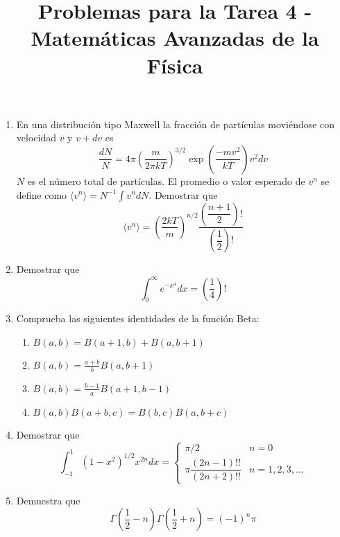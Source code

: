 
\usepackage{standalone}
\usepackage{enumerate}
\usepackage{hyperref}
\usepackage[left=1.5cm,top=1.5cm,right=1.5cm,bottom=1.5cm]{geometry}
\title{Problemas para la Tarea 4 - \\ \large{Matemáticas Avanzadas de la Física}}
\date{ }

\vspace{-4cm}
\renewcommand\labelenumii{\theenumi.{\arabic{enumii}}}
\maketitle
\fontsize{14}{14}\selectfont
\begin{enumerate}
\item En una distribución tipo Maxwell la fracción de partículas moviéndose con velocidad $v$ y $v+dv$ es
\[ \dfrac{dN}{N} = 4 \pi \left( \dfrac{m}{2 \pi k T} \right)^{3/2} \exp \left( \dfrac{-mv^{2}}{ k T} \right) v^{2} dv \]
$N$ es el número total de partículas. El promedio o valor esperado de $v^{n}$ se define como $\langle v^{n} \rangle = N^{-1} \int v^{n} dN$. Demostrar que
\[ \langle v^{n} \rangle = \left( \dfrac{2 k T}{m} \right)^{n/2} \dfrac{\left( \dfrac{n+1}{2} \right) !} { \left( \dfrac{1}{2} \right) !} \]
\item Demostrar que
\[ \int_{0}^{\infty} e^{-x^{4}} dx = \left( \dfrac{1}{4} \right) !\]
\item Comprueba las siguientes identidades de la función Beta:
\begin{enumerate}
\item $B(a,b) = B(a+1,b) + B(a,b+1)$
\item $B(a,b) = \frac{a+b}{b} B(a,b+1)$ 
\item $B(a,b) = \frac{b-1}{a} B(a+1,b-1)$
\item $B(a,b) B(a+b,c) = B(b,c) B(a,b+c)$
\end{enumerate}
\item Demostrar que
\[ \int_{-1}^{1} (1-x^{2})^{1/2} x^{2n} dx =  
\begin{cases}
\pi/2 & n = 0 \\
\pi \dfrac{(2n-1)!!}{(2n+2)!!} & n=1,2,3,\ldots  \end{cases}
 \]
\item Demuestra que 
\[ \Gamma(\frac{1}{2} - n) \Gamma(\frac{1}{2} + n) = (-1)^{n} \pi \]
\end{enumerate}
